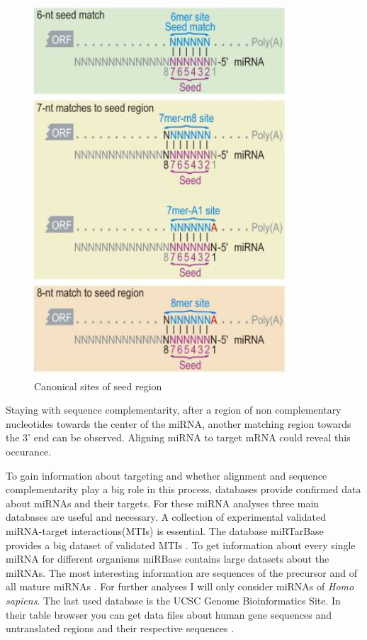 \documentclass[12pt]{article}
\begin{document}
\begin{figure}[h]
\centering
\includegraphics[scale=0.6]{results/canonical_sites.png}
\caption{Canonical sites of seed region}
\label{Fig:canonical}
\end{figure}

Staying with sequence complementarity, after a region of non complementary nucleotides towards the center of the miRNA, another matching region towards the 3' end can be observed. Aligning miRNA to target mRNA could reveal this occurance. 

To gain information about targeting and whether alignment and sequence complementarity play a big role in this process, databases provide confirmed data about miRNAs and their targets. 
For these miRNA analyses three main databases are useful and necessary. A collection of experimental validated miRNA-target interactions(MTIs) is essential. The database miRTarBase provides a big dataset of validated MTIs \cite{Hsu}. To get information about every single miRNA for different organisms miRBase contains large datasets about the miRNAs. The most interesting information are sequences of the precursor and of all mature miRNAs \cite{mirbase}. For further analyses I will only consider miRNAs of \textit{Homo sapiens}. The last used database is the UCSC Genome Bioinformatics Site. In their table browser you can get data files about human gene sequences and untranslated regions and their respective sequences \cite{ucsc}.
  
\end{document}
